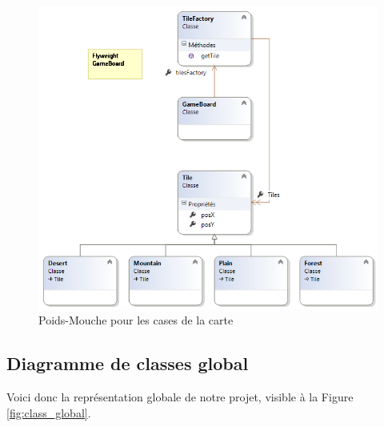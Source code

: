 \documentclass[a4paper]{article}
\begin{document}
\begin{figure}[ht]
\centering
	\includegraphics[width=\textwidth]{../Schemas/class_GameBoard_PoidsMouche.png}
		\caption{Poids-Mouche pour les cases de la carte}
		\label{fig:class_poidsmouche}
\end{figure}

\clearpage
	\subsection{Diagramme de classes global}
Voici donc la représentation globale de notre projet, visible à la Figure \ref{fig:class_global}.
\end{document}
